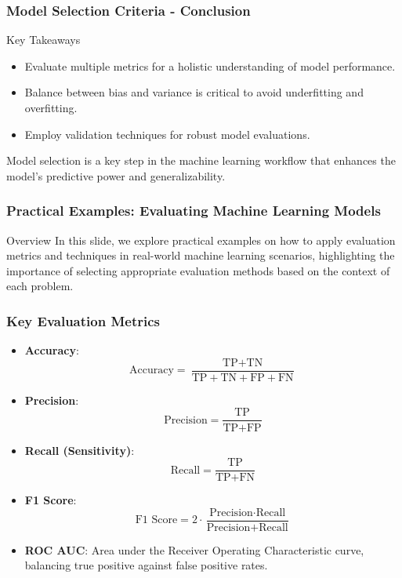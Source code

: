 \documentclass[aspectratio=169]{beamer}
\begin{document}
\begin{frame}[fragile]
    \frametitle{Model Selection Criteria - Conclusion}
    \begin{block}{Key Takeaways}
        \begin{itemize}
            \item Evaluate multiple metrics for a holistic understanding of model performance.
            \item Balance between bias and variance is critical to avoid underfitting and overfitting.
            \item Employ validation techniques for robust model evaluations.
        \end{itemize}
    \end{block}
    Model selection is a key step in the machine learning workflow that enhances the model's predictive power and generalizability.
\end{frame}

\begin{frame}[fragile]
    \frametitle{Practical Examples: Evaluating Machine Learning Models}
    \begin{block}{Overview}
        In this slide, we explore practical examples on how to apply evaluation metrics and techniques in real-world machine learning scenarios, highlighting the importance of selecting appropriate evaluation methods based on the context of each problem.
    \end{block}
\end{frame}

\begin{frame}[fragile]
    \frametitle{Key Evaluation Metrics}
    \begin{itemize}
        \item \textbf{Accuracy}:
        \begin{equation}
            \text{Accuracy} = \frac{\text{TP} + \text{TN}}{\text{TP} + \text{TN} + \text{FP} + \text{FN}}
        \end{equation}
        \item \textbf{Precision}:
        \begin{equation}
            \text{Precision} = \frac{\text{TP}}{\text{TP} + \text{FP}}
        \end{equation}
        \item \textbf{Recall (Sensitivity)}:
        \begin{equation}
            \text{Recall} = \frac{\text{TP}}{\text{TP} + \text{FN}}
        \end{equation}
        \item \textbf{F1 Score}:
        \begin{equation}
            \text{F1 Score} = 2 \cdot \frac{\text{Precision} \cdot \text{Recall}}{\text{Precision} + \text{Recall}}
        \end{equation}
        \item \textbf{ROC AUC}: Area under the Receiver Operating Characteristic curve, balancing true positive against false positive rates.
    \end{itemize}
\end{frame}
\end{document}
